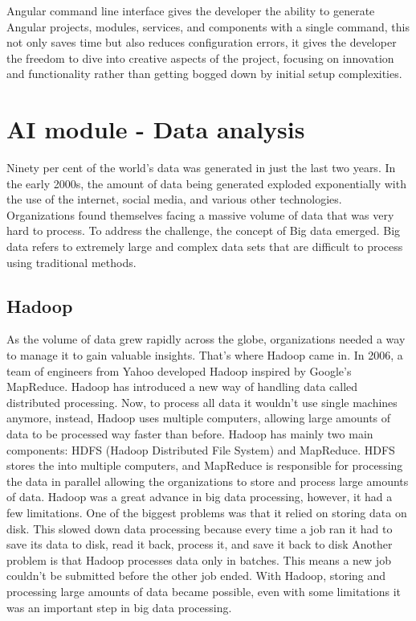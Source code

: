 Angular command line interface gives the developer the ability to generate Angular projects, modules, services, and components with a single command, this not only saves time but also reduces configuration errors, it gives the developer the freedom to dive into creative aspects of the project, focusing on innovation and functionality rather than getting bogged down by initial setup complexities.

\section{AI module - Data analysis}
Ninety per cent of the world's data was generated in just the last two years. In the early 2000s, the amount of data being generated exploded exponentially with the use of the internet, social media, and various other technologies. Organizations found themselves facing a massive volume of data that was very hard to process. To address the challenge, the concept of Big data emerged. Big data refers to extremely large and complex data sets that are difficult to process using traditional methods. \cite{bigdata}

\subsection{Hadoop}
As the volume of data grew rapidly across the globe, organizations needed a way to manage it to gain valuable insights. That’s where Hadoop came in. In 2006, a team of engineers from Yahoo developed Hadoop inspired by Google’s MapReduce. Hadoop has introduced a new way of handling data called distributed processing. Now, to process all data it wouldn't use single machines anymore, instead, Hadoop uses multiple computers, allowing large amounts of data to be processed way faster than before.
Hadoop has mainly two main components: HDFS (Hadoop Distributed File System) and MapReduce. HDFS stores the into multiple computers, and MapReduce is responsible for processing the data in parallel allowing the organizations to store and process large amounts of data.
Hadoop was a great advance in big data processing, however, it had a few limitations. One of the biggest problems was that it relied on storing data on disk. This slowed down data processing because every time a job ran it had to save its data to disk, read it back, process it, and save it back to disk Another problem is that Hadoop processes data only in batches. This means a new job couldn't be submitted before the other job ended.
With Hadoop, storing and processing large amounts of data became possible, even with some limitations it was an important step in big data processing.\cite{hadoop}



